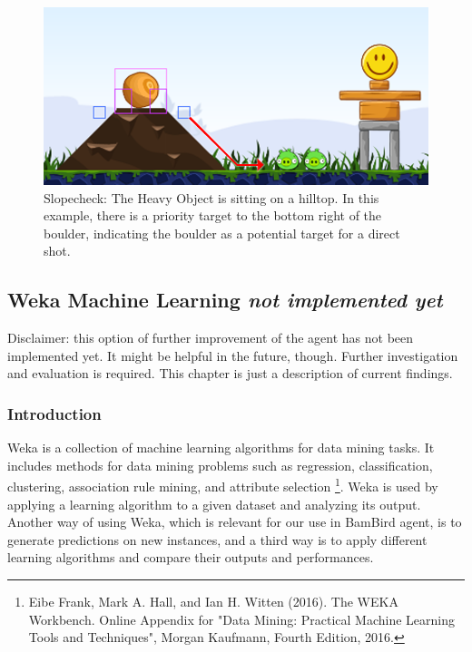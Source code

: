\begin{figure}
	\includegraphics[width=\textwidth]{img/shot1hr}
	\caption{Slopecheck: The Heavy Object is sitting on a hilltop.  In this example, there is a priority target to the bottom right of the boulder, indicating the boulder as a potential target for a direct shot.}\label{fig:slopeEx}
\end{figure}

\subsection{Weka Machine Learning \textit{not implemented yet}}
Disclaimer: this option of further improvement of the agent has not been implemented yet. It might be helpful in the future, though. Further investigation and evaluation is required. This chapter is just a description of current findings.

\subsubsection{Introduction}
Weka is a collection of machine learning algorithms for data mining tasks. It includes methods for data mining problems such as regression, classification, clustering, association rule mining, and attribute selection \footnote{Eibe Frank, Mark A. Hall, and Ian H. Witten (2016). The WEKA Workbench. Online Appendix for "Data Mining: Practical Machine Learning Tools and Techniques", Morgan Kaufmann, Fourth Edition, 2016.}. Weka is used by applying a learning algorithm to a given dataset and analyzing its output. Another way of using Weka, which is relevant for our use in BamBird agent, is to generate predictions on new instances, and a third way is to apply different learning algorithms and compare their outputs and performances.

